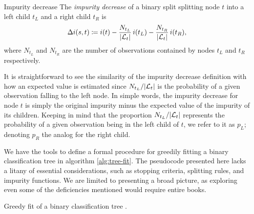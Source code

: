 \begin{dfn}{Impurity decrease}{}
    The \emph{impurity decrease} of a binary split splitting node $t$ into a
    left child $t_L$ and a right child $t_R$ is
    \begin{equation*}
        \Delta i(s, t) \coloneqq i(t) - \frac{N_{t_L}}{|\mathcal{L}_t|} \, i(t_L) - \frac{N_{t_R}}{|\mathcal{L}_t|} \, i(t_R),
    \end{equation*}
    where $N_{t_L}$ and $N_{t_R}$ are the number of observations contained by
    nodes $t_L$ and $t_R$ respectively.
\end{dfn}

It is straightforward to see the similarity of the impurity decrease definition
with how an expected value is estimated since $N_{t_L} / |\mathcal{L}_t|$ is the
probability of a given observation falling to the left node. In simple words,
the impurity decrease for node $t$ is simply the original impurity minus the
expected value of the impurity of its children. Keeping in mind that the
proportion $N_{t_L} / |\mathcal{L}_t|$ represents the probability of a given observation
being in the left child of $t$, we refer to it as $p_L$; denoting $p_R$ the
analog for the right child.

We have the tools to define a formal procedure for greedily fitting a binary
classification tree in algorithm \ref{alg:tree-fit}. The pseudocode presented
here lacks a litany of essential considerations, such as stopping criteria,
splitting rules, and impurity functions. We are limited to presenting a broad
picture, as exploring even some of the deficiencies mentioned would require
entire books.

\begin{algorithm}
    \caption[Greedy tree fitting algorithm]{Greedy fit of a binary
        classification tree \cite[Ch.~3.3]{louppe2014}.}
    \label{alg:tree-fit}
\end{algorithm}

